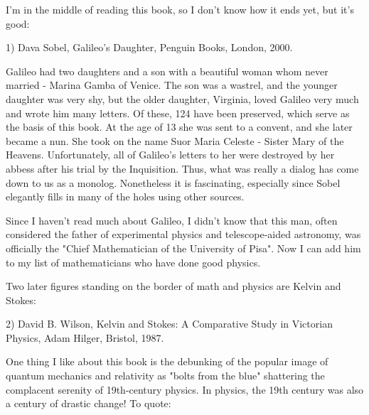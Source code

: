 


I'm in the middle of reading this book, so I don't know how it ends
yet, but it's good:

1) Dava Sobel, Galileo's Daughter, Penguin Books, London, 2000.

Galileo had two daughters and a son with a beautiful woman whom never
married - Marina Gamba of Venice.  The son was a wastrel, and the
younger daughter was very shy, but the older daughter, Virginia, loved
Galileo very much and wrote him many letters.  Of these, 124 have been
preserved, which serve as the basis of this book.  At the age of 13 she
was sent to a convent, and she later became a nun.  She took on the
name Suor Maria Celeste - Sister Mary of the Heavens.   Unfortunately,
all of Galileo's letters to her were destroyed by her abbess after
his trial by the Inquisition.  Thus, what was really a dialog has come
down to us as a monolog.  Nonetheless it is fascinating, especially since
Sobel elegantly fills in many of the holes using other sources.  

Since I haven't read much about Galileo, I didn't know that this man,
often considered the father of experimental physics and telescope-aided
astronomy, was officially the "Chief Mathematician of the University of
Pisa".  Now I can add him to my list of mathematicians who have done good 
physics.  

Two later figures standing on the border of math and physics are Kelvin
and Stokes:

2) David B. Wilson, Kelvin and Stokes: A Comparative Study in Victorian
Physics, Adam Hilger, Bristol, 1987.

One thing I like about this book is the debunking of the popular image
of quantum mechanics and relativity as "bolts from the blue"
shattering the complacent serenity of 19th-century physics.  In physics,
the 19th century was also a century of drastic change!  To quote:

